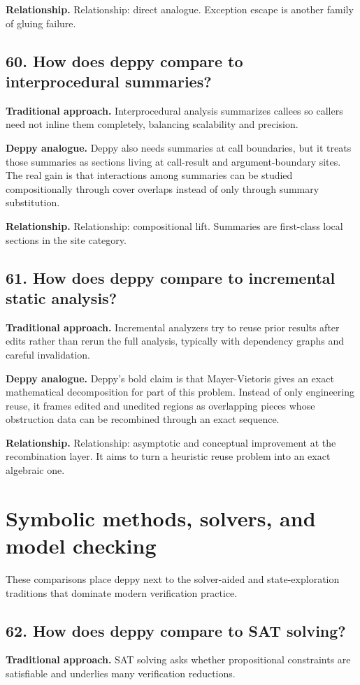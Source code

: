 \documentclass[11pt,openany]{book}
\begin{document}
\textbf{Relationship.} Relationship: direct analogue. Exception escape is another family of gluing failure.

\section*{60. How does deppy compare to interprocedural summaries?}
\textbf{Traditional approach.} Interprocedural analysis summarizes callees so callers need not inline them completely, balancing scalability and precision.

\textbf{Deppy analogue.} Deppy also needs summaries at call boundaries, but it treats those summaries as sections living at call-result and argument-boundary sites. The real gain is that interactions among summaries can be studied compositionally through cover overlaps instead of only through summary substitution.

\textbf{Relationship.} Relationship: compositional lift. Summaries are first-class local sections in the site category.

\section*{61. How does deppy compare to incremental static analysis?}
\textbf{Traditional approach.} Incremental analyzers try to reuse prior results after edits rather than rerun the full analysis, typically with dependency graphs and careful invalidation.

\textbf{Deppy analogue.} Deppy's bold claim is that Mayer-Vietoris gives an exact mathematical decomposition for part of this problem. Instead of only engineering reuse, it frames edited and unedited regions as overlapping pieces whose obstruction data can be recombined through an exact sequence.

\textbf{Relationship.} Relationship: asymptotic and conceptual improvement at the recombination layer. It aims to turn a heuristic reuse problem into an exact algebraic one.

\chapter{Symbolic methods, solvers, and model checking}
These comparisons place deppy next to the solver-aided and state-exploration traditions that dominate modern verification practice.

\section*{62. How does deppy compare to SAT solving?}
\textbf{Traditional approach.} SAT solving asks whether propositional constraints are satisfiable and underlies many verification reductions.
\end{document}
